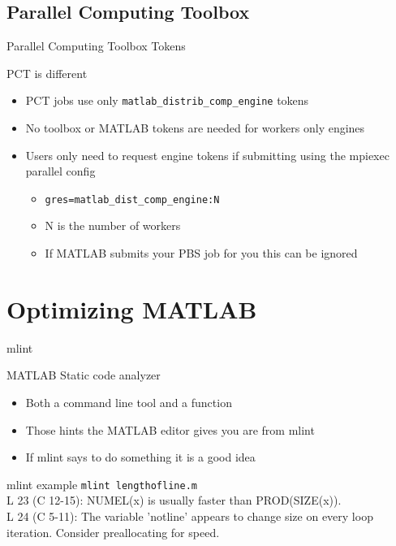 \documentclass[handout]{beamer}
\begin{document}
   \subsection{Parallel Computing Toolbox}
   \begin{frame}{Parallel Computing Toolbox Tokens}
    \begin{block}{PCT is different}
     \begin{itemize}
      \item PCT jobs use only \texttt{matlab\_distrib\_comp\_engine} tokens 
      \item No toolbox or MATLAB tokens are needed for workers only engines
      \item Users only need to request engine tokens if submitting using the mpiexec parallel config
      \begin{itemize}
       \item \texttt{gres=matlab\_dist\_comp\_engine:N}
       \item N is the number of workers
       \item If MATLAB submits your PBS job for you this can be ignored
      \end{itemize}
     \end{itemize}
    \end{block}
   \end{frame}

  \section{Optimizing MATLAB}
  \begin{frame}{mlint}
   \begin{block}{MATLAB Static code analyzer}
    \begin{itemize}
     \item Both a command line tool and a function
     \item Those hints the MATLAB editor gives you are from mlint
     \item If mlint says to do something it is a good idea
    \end{itemize}
   \end{block}
   \begin{block}{mlint example}
    \texttt{mlint lengthofline.m} \\
L 23 (C 12-15): NUMEL(x) is usually faster than PROD(SIZE(x)). \\
L 24 (C 5-11): The variable 'notline' appears to change size on every loop iteration. Consider preallocating for speed.
   \end{block}
  \end{frame}
\end{document}
